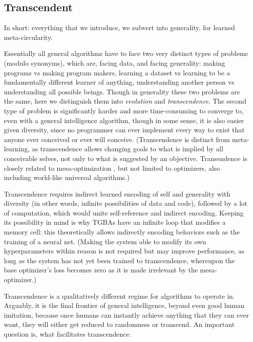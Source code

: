 \documentclass{article}
\begin{document}
\subsection{Transcendent}

In short: everything that we introduce, we subvert into generality, for learned meta-circularity.

Essentially all general algorithms have to face two very distinct types of problems (modulo synonyms), which are, facing data, and facing generality: making programs vs making program makers, learning a dataset vs learning to be a fundamentally different learner of anything, understanding another person vs understanding all possible beings. Though in generality these two problems are the same, here we distinguish them into \textit{evolution} and \textit{transcendence}. The second type of problem is significantly harder and more time-consuming to converge to, even with a general intelligence algorithm, though in some sense, it is also easier given diversity, since no programmer can ever implement every way to exist that anyone ever conceived or ever will conceive. (Transcendence is distinct from meta-learning, as transcendence allows changing goals to what is implied by all conceivable selves, not only to what is suggested by an objective. Transendence is closely related to mesa-optimization \cite{hubinger2019risks}, but not limited to optimizers, also including world-like universal algorithms.)

Transcendence requires indirect learned encoding of self and generality with diversity (in other words, infinite possibilities of data and code), followed by a lot of computation, which would unite self-reference and indirect encoding. Keeping its possibility in mind is why TGBAs have an infinite loop that modifies a memory cell: this theoretically allows indirectly encoding behaviors such as the training of a neural net. (Making the system able to modify its own hyperparameters within reason is not required but may improve performance, as long as the system has not yet been trained to transcendence, whereupon the base optimizer's loss becomes zero as it is made irrelevant by the mesa-optimizer.)

Transcendence is a qualitatively different regime for algorithms to operate in. Arguably, it is the final frontier of general intelligence, beyond even good human imitation, because once humans can instantly achieve anything that they can ever want, they will either get reduced to randomness or transcend. An important question is, what facilitates transcendence.
\end{document}
